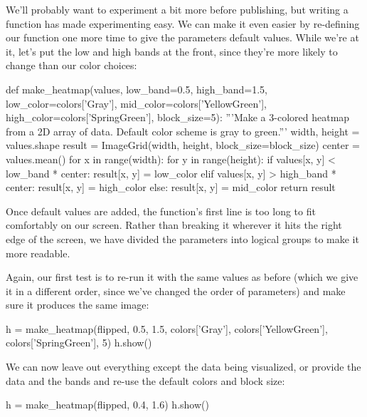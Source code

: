 
We'll probably want to experiment a bit more before publishing, but
writing a function has made experimenting easy. We can make it even
easier by re-defining our function one more time to give the parameters
default values. While we're at it, let's put the low and high bands at
the front, since they're more likely to change than our color choices:

\begin{VerbIn}
def make_heatmap(values,
                 low_band=0.5, high_band=1.5,
                 low_color=colors['Gray'], mid_color=colors['YellowGreen'], high_color=colors['SpringGreen'],
                 block_size=5):
    '''Make a 3-colored heatmap from a 2D array of data.
    Default color scheme is gray to green.'''
    width, height = values.shape
    result = ImageGrid(width, height, block_size=block_size)
    center = values.mean()
    for x in range(width):
        for y in range(height):
            if values[x, y] < low_band * center:
                result[x, y] = low_color
            elif values[x, y] > high_band * center:
                result[x, y] = high_color
            else:
                result[x, y] = mid_color
    return result
\end{VerbIn}

Once default values are added, the function's first line is too long to
fit comfortably on our screen. Rather than breaking it wherever it hits
the right edge of the screen, we have divided the parameters into
logical groups to make it more readable.

Again, our first test is to re-run it with the same values as before
(which we give it in a different order, since we've changed the order of
parameters)
and make sure it produces the same image:

\begin{VerbIn}
h = make_heatmap(flipped, 0.5, 1.5, colors['Gray'], colors['YellowGreen'], colors['SpringGreen'], 5)
h.show()
\end{VerbIn}

We can now leave out everything except the data being visualized, or
provide the data and the bands and re-use the default colors and block
size:

\begin{VerbIn}
h = make_heatmap(flipped, 0.4, 1.6)
h.show()
\end{VerbIn}


